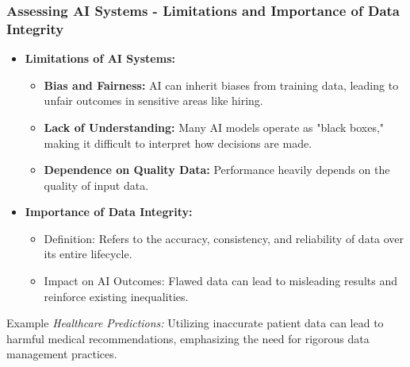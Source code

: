 \documentclass{beamer}
\begin{document}
\begin{frame}[fragile]
    \frametitle{Assessing AI Systems - Limitations and Importance of Data Integrity}
    \begin{itemize}
        \item \textbf{Limitations of AI Systems:}
            \begin{itemize}
                \item \textbf{Bias and Fairness:} AI can inherit biases from training data, leading to unfair outcomes in sensitive areas like hiring.
                \item \textbf{Lack of Understanding:} Many AI models operate as "black boxes," making it difficult to interpret how decisions are made.
                \item \textbf{Dependence on Quality Data:} Performance heavily depends on the quality of input data.
            \end{itemize}
    
        \item \textbf{Importance of Data Integrity:}
            \begin{itemize}
                \item Definition: Refers to the accuracy, consistency, and reliability of data over its entire lifecycle.
                \item Impact on AI Outcomes: Flawed data can lead to misleading results and reinforce existing inequalities.
            \end{itemize}
    \end{itemize}
    
    \begin{block}{Example}
        \textit{Healthcare Predictions:} Utilizing inaccurate patient data can lead to harmful medical recommendations, emphasizing the need for rigorous data management practices.
    \end{block}
\end{frame}
\end{document}
